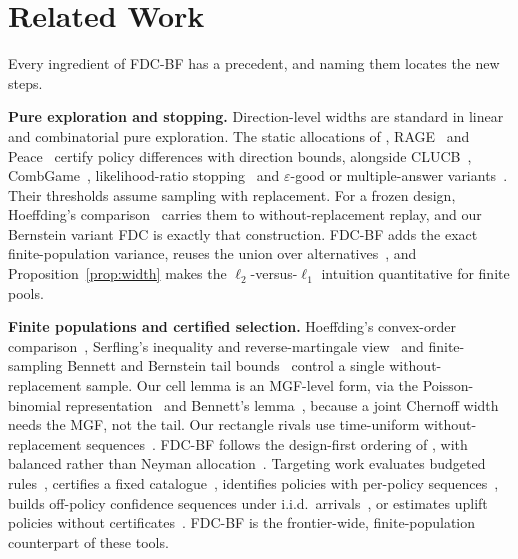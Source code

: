 \documentclass[sigconf,anonymous,review]{acmart}
\newcommand{\eps}{\varepsilon}
\begin{document}
\section{Related Work}\label{sec:related}

Every ingredient of FDC-BF has a precedent, and naming them locates the new steps.

\textbf{Pure exploration and stopping.} Direction-level widths are standard in linear and combinatorial pure exploration. The static allocations of \citet{soare2014best}, RAGE~\citep{fiez2019sequential} and Peace~\citep{katzsamuels2020empirical} certify policy differences with direction bounds, alongside CLUCB~\citep{chen2014combinatorial,chen2017nearly}, CombGame~\citep{jourdan2021efficient}, likelihood-ratio stopping~\citep{garivier2016optimal} and $\eps$-good or multiple-answer variants~\citep{degenne2019pure,jourdan2022choosing,jamieson2018bandit}. Their thresholds assume sampling with replacement. For a frozen design, Hoeffding's comparison~\citep{hoeffding1963probability} carries them to without-replacement replay, and our Bernstein variant FDC is exactly that construction. FDC-BF adds the exact finite-population variance, reuses the union over alternatives~\citep{deheide2026union}, and Proposition~\ref{prop:width} makes the $\ell_2$-versus-$\ell_1$ intuition quantitative for finite pools.

\textbf{Finite populations and certified selection.} Hoeffding's convex-order comparison~\citep{hoeffding1963probability}, Serfling's inequality and reverse-martingale view~\citep{serfling1974probability,bardenet2015concentration} and finite-sampling Bennett and Bernstein tail bounds~\citep{greene2017exponential} control a single without-replacement sample. Our cell lemma is an MGF-level form, via the Poisson-binomial representation~\citep{vatutin1982limit,tang2023poisson} and Bennett's lemma~\citep{bennett1962probability}, because a joint Chernoff width needs the MGF, not the tail. Our rectangle rivals use time-uniform without-replacement sequences~\citep{waudbysmith2020confidence,howard2021time,waudbysmith2024estimating}. FDC-BF follows the design-first ordering of \citet{hait2026target}, with balanced rather than Neyman allocation~\citep{neyman1934two,kato2024generalized,dang2026target}. Targeting work evaluates budgeted rules~\citep{imai2023experimental,li2024neyman}, certifies a fixed catalogue~\citep{shekhar2026support}, identifies policies with per-policy sequences~\citep{molitor2026anytime}, builds off-policy confidence sequences under i.i.d.\ arrivals~\citep{karampatziakis2021off,waudbysmith2024anytime,thomas2015high,cho2024cspimt}, or estimates uplift policies without certificates~\citep{sverdrup2023qini,athey2021policy}. FDC-BF is the frontier-wide, finite-population counterpart of these tools.
\end{document}
